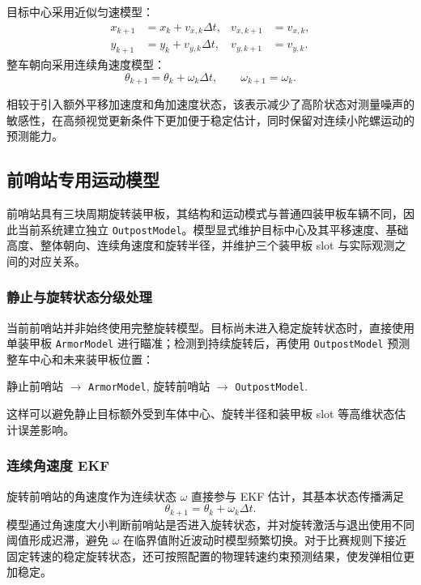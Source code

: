 目标中心采用近似匀速模型：
\begin{equation}
\begin{aligned}
    x_{k+1} &= x_k + v_{x,k}\Delta t, & v_{x,k+1} &= v_{x,k},\\
    y_{k+1} &= y_k + v_{y,k}\Delta t, & v_{y,k+1} &= v_{y,k}.
\end{aligned}
\end{equation}
整车朝向采用连续角速度模型：
\begin{equation}
    \theta_{k+1}=\theta_k+\omega_k\Delta t,
    \qquad
    \omega_{k+1}=\omega_k.
\end{equation}

相较于引入额外平移加速度和角加速度状态，该表示减少了高阶状态对测量噪声的敏感性，在高频视觉更新条件下更加便于稳定估计，同时保留对连续小陀螺运动的预测能力。

\subsection{前哨站专用运动模型}
前哨站具有三块周期旋转装甲板，其结构和运动模式与普通四装甲板车辆不同，因此当前系统建立独立 \lstinline{OutpostModel}。模型显式维护目标中心及其平移速度、基础高度、整体朝向、连续角速度和旋转半径，并维护三个装甲板 slot 与实际观测之间的对应关系。

\subsubsection{静止与旋转状态分级处理}
当前前哨站并非始终使用完整旋转模型。目标尚未进入稳定旋转状态时，直接使用单装甲板 \lstinline{ArmorModel} 进行瞄准；检测到持续旋转后，再使用 \lstinline{OutpostModel} 预测整车中心和未来装甲板位置：
\begin{center}
    静止前哨站 $\rightarrow$ \lstinline{ArmorModel},\qquad
    旋转前哨站 $\rightarrow$ \lstinline{OutpostModel}.
\end{center}
这样可以避免静止目标额外受到车体中心、旋转半径和装甲板 slot 等高维状态估计误差影响。

\subsubsection{连续角速度 EKF}
旋转前哨站的角速度作为连续状态 $\omega$ 直接参与 EKF 估计，其基本状态传播满足
\begin{equation}
    \theta_{k+1}=\theta_k+\omega_k\Delta t.
\end{equation}
模型通过角速度大小判断前哨站是否进入旋转状态，并对旋转激活与退出使用不同阈值形成迟滞，避免 $\omega$ 在临界值附近波动时模型频繁切换。对于比赛规则下接近固定转速的稳定旋转状态，还可按照配置的物理转速约束预测结果，使发弹相位更加稳定。

